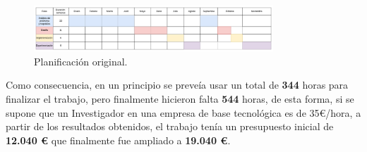     \begin{figure}[!h]
        \centering
        \includegraphics[width=0.8\textwidth]{img/plan_definitivo.png}
        \caption{Planificación original.}
        \label{Fig::Planificacion final}
    \end{figure}

    \medskip

    \noindent Como consecuencia, en un principio se preveía usar un total de \textbf{344} horas para finalizar el trabajo, pero finalmente hicieron falta \textbf{544} horas, de esta forma, si se supone que un Investigador en una empresa de base tecnológica es de 35€/hora, a partir de los resultados obtenidos, el trabajo tenía un presupuesto inicial de \textbf{12.040 €} que finalmente fue ampliado a \textbf{19.040 €}.

\endinput


